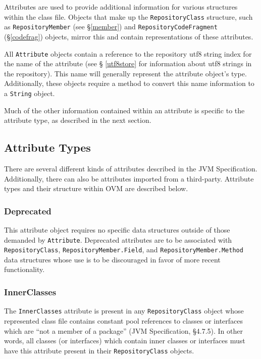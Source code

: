 \documentclass{report}
\begin{document}
Attributes are used to provide additional information for various structures
within the class file. Objects that make up the 
\texttt{Re\-pos\-i\-tory\-Class} structure, such as 
\texttt{Re\-pos\-i\-tory\-Mem\-ber} (see \S \ref{member})
and \texttt{RepositoryCodeFragment} (\S \ref{codefrag}) objects, 
mirror this and contain representations of these attributes.

All \texttt{Attribute} objects contain a reference to the
repository utf8 string index for the name of the attribute (see \S
\ref{utf8store} for information about utf8 strings in the repository). 
This name will generally represent the attribute object's type. Additionally,
these objects require a method to convert this name information to a
\texttt{String} object. 


Much of the other information contained within an attribute is specific
to the attribute type, as described in the next section.

\subsection{Attribute Types}\label{atttypes}

There are several different kinds of attributes described in the JVM
Specification. Additionally, there can also be attributes imported from a
third-party. Attribute types and their structure within OVM are described
below.

\subsubsection{Deprecated}

This attribute object requires no specific data structures outside of those
demanded by \texttt{Attribute}. Deprecated attributes are to be 
associated with \texttt{Re\-pos\-i\-tory\-Class}, 
\texttt{Re\-pos\-i\-tory\-Mem\-ber.Field}, and
\texttt{Re\-pos\-i\-tory\-Mem\-ber.Meth\-od} data structures whose use is to 
be discouraged in favor of more recent functionality.

\subsubsection{InnerClasses}

The \texttt{InnerClasses} attribute is present in any 
\texttt{Re\-pos\-i\-tory\-Class} object whose represented class file contains 
constant pool references to classes or interfaces which are 
``not a member of a package'' (JVM Specification, \S 4.7.5). 
In other words, all classes (or interfaces) which contain inner classes 
or interfaces must have this attribute present in their
\texttt{Re\-pos\-i\-tory\-Class} objects.
\end{document}
